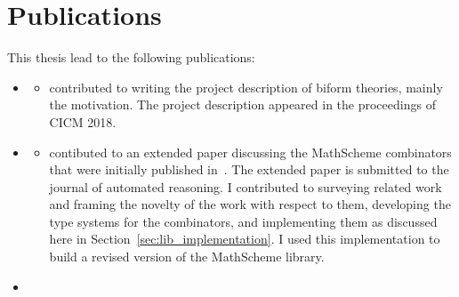 \section{Publications}
This thesis lead to the following publications: 
\begin{itemize}
    \item \cite{biformCICM2018} 
        \begin{itemize}
        \item[] contributed to writing the project description of biform theories, mainly the motivation. The project description appeared in the proceedings of CICM 2018. 
        \end{itemize}
    \item \cite{carette2018building} 
    \begin{itemize} 
    \item[] contibuted to an extended paper discussing the MathScheme combinators that were initially published in~\cite{CaretteOConnorTPC}. The extended paper is submitted to the journal of automated reasoning. I contributed to surveying related work and framing the novelty of the work with respect to them, developing the type systems for the combinators, and implementing them as discussed here in Section~\ref{sec:lib_implementation}. I used this implementation to build a revised version of the MathScheme library. 
   \end{itemize}
    \item ~\cite{cicm2019diagrams} 

\end{itemize}
